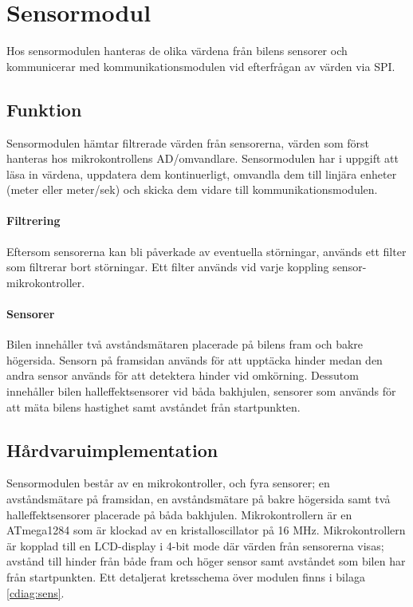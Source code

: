 \documentclass[tekniskrapport/tech.tex]{subfiles}
\begin{document}
\section{Sensormodul}
Hos sensormodulen hanteras de olika värdena från bilens sensorer och
kommunicerar med kommunikationsmodulen vid efterfrågan av värden via SPI.

\subsection{Funktion}
Sensormodulen hämtar filtrerade värden från sensorerna, värden som först
hanteras hos mikrokontrollens AD/omvandlare. Sensormodulen har i uppgift att
läsa in värdena, uppdatera dem kontinuerligt, omvandla dem till linjära enheter
(meter eller meter/sek) och skicka dem vidare till kommunikationsmodulen.

\paragraph{Filtrering}
Eftersom sensorerna kan bli påverkade av eventuella störningar, används ett
filter som filtrerar bort störningar. Ett filter används vid varje koppling
sensor-mikrokontroller.

\paragraph{Sensorer}
Bilen innehåller två avståndsmätaren placerade på bilens fram och bakre
högersida. Sensorn på framsidan används för att upptäcka hinder medan den andra
sensor används för att detektera hinder vid omkörning. Dessutom innehåller
bilen halleffektsensorer vid båda bakhjulen, sensorer som används för att mäta
bilens hastighet samt avståndet från startpunkten.

\subsection{Hårdvaruimplementation}
Sensormodulen består av en mikrokontroller, och fyra sensorer; en
avståndsmätare på framsidan, en avståndsmätare på bakre högersida samt två
halleffektsensorer placerade på båda bakhjulen.  Mikrokontrollern är en
ATmega1284 som är klockad av en kristalloscillator på 16 MHz. Mikrokontrollern
är kopplad till en LCD-display i 4-bit mode där värden från sensorerna visas;
avstånd till hinder från både fram och höger sensor samt avståndet som bilen
har från startpunkten. Ett detaljerat kretsschema över modulen finns i bilaga
\ref{cdiag:sens}.
\end{document}
